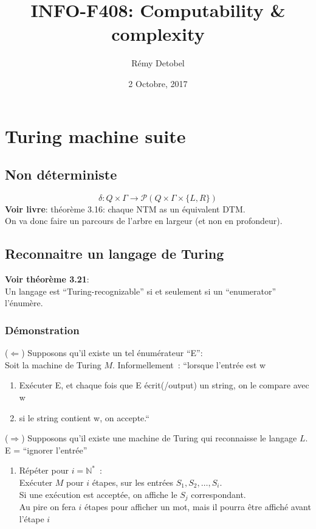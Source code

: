 \documentclass[a4paper,12pt]{article}
\title{INFO-F408: Computability \& complexity}
\author{Rémy Detobel}
\date{2 Octobre, 2017}
\begin{document}
\maketitle
\newpage

\section{Turing machine suite}
  \subsection{Non déterministe}
    $$\delta: Q \times \Gamma \rightarrow \mathcal P ( Q \times \Gamma \times \{L, R\})$$
    \textbf{Voir livre}: théorème 3.16: chaque NTM as un équivalent DTM.\\
    On va donc faire un parcours de l'arbre en largeur (et non en profondeur).

  \subsection{Reconnaitre un langage de Turing}
    \textbf{Voir théorème 3.21}:\\
    Un langage est ``Turing-recognizable'' si et seulement si un ``enumerator'' l'énumère.

    \subsubsection{Démonstration}
      ($\Leftarrow$) Supposons qu'il existe un tel énumérateur ``E'':\\
      Soit la machine de Turing $M$. Informellement~: ``lorsque l'entrée est w
      \begin{enumerate}
	\item Exécuter E, et chaque fois que E écrit(/output) un string, on le compare avec w
	\item si le string contient w, on accepte.``
      \end{enumerate}

      ($\Rightarrow$) Supposons qu'il existe une machine de Turing qui reconnaisse le langage $L$.\\
      E = ``ignorer l'entrée''
      \begin{enumerate}
	\item Répéter pour $i = \mathbb N^*$~:\\
	Exécuter $M$ pour $i$ étapes, sur les entrées $S_1, S_2, \ldots, S_i$.\\
	Si une exécution est acceptée, on affiche le $S_j$ correspondant.\\
	Au pire on fera $i$ étapes pour afficher un mot, mais il pourra être affiché avant l'étape $i$
      \end{enumerate}
\end{document}
